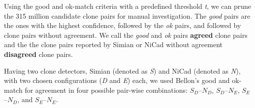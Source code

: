 \documentclass[sigconf,review, anonymous]{acmart}
\begin{document}
Using the good and ok-match criteria with a predefined threshold
\textit{t}, we can prune the 315 million candidate clone pairs for
manual investigation. The \textit{good} pairs are the ones with the
highest confidence, followed by the \textit{ok} pairs, and followed by
clone pairs without agreement. We call the \textit{good} and
\textit{ok} pairs \textbf{agreed} clone pairs and the the clone pairs
reported by Simian or NiCad without agreement \textbf{disagreed} clone
pairs.

Having two clone detectors, Simian
(denoted as \textit{S}) and NiCad (denoted as \textit{N}), with two
chosen configurations (\textit{D} and \textit{E}) each, we used
Bellon's good and ok-match for agreement in four possible pair-wise
combinations: $S_{D}$--$N_{D}$, $S_{D}$--$N_{E}$, $S_{E}$--$N_{D}$,
and $S_{E}$--$N_{E}$.



\end{document}
